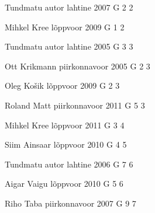 \documentclass[11pt]{article}
\begin{document}
{Tundmatu autor} %
{lahtine} %
{2007} %
{G 2} %
{2} %
{

\ifEngHint
\fi
}

{Mihkel Kree} %
{lõppvoor} %
{2009} %
{G 1} %
{2} %
{

\ifEngHint
\fi
}

{Tundmatu autor} %
{lahtine} %
{2005} %
{G 3} %
{3} %
{

\ifEngHint
\fi
}

{Ott Krikmann} %
{piirkonnavoor} %
{2005} %
{G 2} %
{3} %
{

\ifEngHint
\fi
}

{Oleg Košik} %
{lõppvoor} %
{2009} %
{G 2} %
{3} %
{

\ifEngHint
\fi
}

{Roland Matt} %
{piirkonnavoor} %
{2011} %
{G 5} %
{3} %
{

\ifEngHint
\fi
}

{Mihkel Kree} %
{lõppvoor} %
{2011} %
{G 3} %
{4} %
{

\ifEngHint
\fi
}

{Siim Ainsaar} %
{lõppvoor} %
{2010} %
{G 4} %
{5} %
{

\ifEngHint
\fi
}

{Tundmatu autor} %
{lahtine} %
{2006} %
{G 7} %
{6} %
{

\ifEngHint
\fi
}

{Aigar Vaigu} %
{lõppvoor} %
{2010} %
{G 5} %
{6} %
{

\ifEngHint
\fi
}

{Riho Taba} %
{piirkonnavoor} %
{2007} %
{G 9} %
{7} %
{

\ifEngHint
\fi
}
\end{document}
